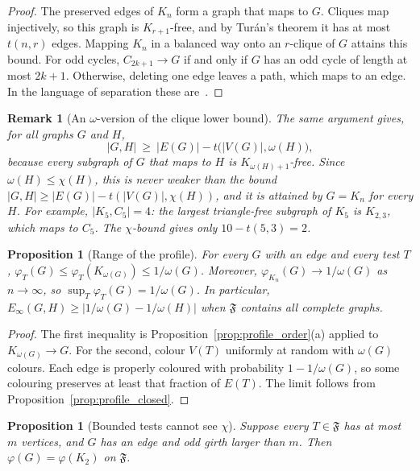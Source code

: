 \documentclass{article}
\newtheorem{proposition}[theorem]{Proposition}
\newtheorem{remark}[theorem]{Remark}
\begin{document}
\begin{proof}
The preserved edges of $K_n$ form a graph that maps to $G$.  Cliques map
injectively, so this graph is $K_{r+1}$-free, and by Tur\'an's theorem it
has at most $t(n,r)$ edges.  Mapping $K_n$ in a balanced way onto an
$r$-clique of $G$ attains this bound.  For odd cycles, $C_{2k+1}\to G$ if
and only if $G$ has an odd cycle of length at most $2k+1$.  Otherwise,
deleting one edge leaves a path, which maps to an edge.  In the language of
separation these are~\cite[Props.~2.4, 2.5]{efjt2015}.
\end{proof}

\begin{remark}[An $\omega$-version of the clique lower bound]
\label{rem:omega_bound}
The same argument gives, for all graphs $G$ and $H$,
\[
  |G,H|\ \ge\ |E(G)|-t\bigl(|V(G)|,\omega(H)\bigr),
\]
because every subgraph of $G$ that maps to $H$ is $K_{\omega(H)+1}$-free.
Since $\omega(H)\le\chi(H)$, this is never weaker than the bound
$|G,H|\ge|E(G)|-t(|V(G)|,\chi(H))$, and it is attained by $G=K_n$ for
\emph{every} $H$.  For example, $|K_5,C_5|=4$: the largest triangle-free
subgraph of $K_5$ is $K_{2,3}$, which maps to $C_5$.  The $\chi$-bound gives
only $10-t(5,3)=2$.
\end{remark}

\begin{proposition}[Range of the profile]
\label{prop:profile_range}
For every $G$ with an edge and every test $T$,
$\varphi_T(G)\le\varphi_T(K_{\omega(G)})\le 1/\omega(G)$.
Moreover, $\varphi_{K_n}(G)\to1/\omega(G)$ as $n\to\infty$, so
$\sup_T\varphi_T(G)=1/\omega(G)$.  In particular,
$E_\infty(G,H)\ge\bigl|1/\omega(G)-1/\omega(H)\bigr|$ when $\mathfrak F$
contains all complete graphs.
\end{proposition}

\begin{proof}
The first inequality is Proposition~\ref{prop:profile_order}(a) applied to
$K_{\omega(G)}\to G$.  For the second, colour $V(T)$ uniformly at random
with $\omega(G)$ colours.  Each edge is properly coloured with probability
$1-1/\omega(G)$, so some colouring preserves at least that fraction of
$E(T)$.  The limit follows from Proposition~\ref{prop:profile_closed}.
\end{proof}

\begin{proposition}[Bounded tests cannot see $\chi$]
\label{prop:profile_blind}
Suppose every $T\in\mathfrak F$ has at most $m$ vertices, and $G$ has an
edge and odd girth larger than $m$.  Then $\varphi(G)=\varphi(K_2)$ on
$\mathfrak F$.
\end{proposition}
\end{document}
